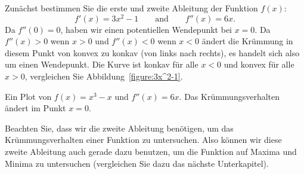 \begin{solution}
Zunächst bestimmen Sie die erste und zweite Ableitung der Funktion $f(x)$:
\[
f'(x)=3x^2-1\qquad\text{and}\qquad f''(x)=6x.
\]
Da $f''(0)=0$, haben wir einen potentiellen Wendepunkt bei $x=0$. Da $f''(x)>0$ wenn $x>0$ und $f''(x)<0$ wenn $x<0$ ändert die Krümmung in diesem Punkt von konvex zu konkav (von links nach rechts), es handelt sich also um einen Wendepunkt. Die Kurve ist konkav für alle $x<0$ und konvex für alle $x>0$, vergleichen Sie Abbildung~\ref{figure:3x^2-1}.
\end{solution}
\begin{marginfigure}[0in]
\caption{Ein Plot von $f(x) = x^3-x$ und $f''(x) = 6x$. Das Krümmungsverhalten ändert im Punkt $x=0$.}
\label{figure:3x^2-1}
\end{marginfigure}

Beachten Sie, dass wir die zweite Ableitung benötigen, um das Krümmungsverhalten einer Funktion zu untersuchen. Also können wir diese zweite Ableitung auch gerade dazu benutzen, um die Funktion auf Maxima und Minima zu untersuchen (vergleichen Sie dazu das nächste Unterkapitel).


